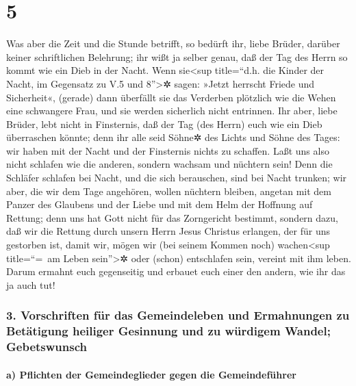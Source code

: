 \hypertarget{section-4}{%
\section{5}\label{section-4}}

 Was aber die Zeit und die Stunde betrifft, so bedürft
ihr, liebe Brüder, darüber keiner schriftlichen Belehrung;
 ihr wißt ja selber genau, daß der Tag des Herrn so kommt
wie ein Dieb in der Nacht.  Wenn sie\textless sup
title=``d.h. die Kinder der Nacht, im Gegensatz zu V.5 und
8''\textgreater✲ sagen: »Jetzt herrscht Friede und Sicherheit«, (gerade)
dann überfällt sie das Verderben plötzlich wie die Wehen eine schwangere
Frau, und sie werden sicherlich nicht entrinnen.  Ihr
aber, liebe Brüder, lebt nicht in Finsternis, daß der Tag (des Herrn)
euch wie ein Dieb überraschen könnte;  denn ihr alle seid
Söhne✲ des Lichts und Söhne des Tages: wir haben mit der Nacht und der
Finsternis nichts zu schaffen.  Laßt uns also nicht
schlafen wie die anderen, sondern wachsam und nüchtern sein!
 Denn die Schläfer schlafen bei Nacht, und die sich
berauschen, sind bei Nacht trunken;  wir aber, die wir dem
Tage angehören, wollen nüchtern bleiben, angetan mit dem Panzer des
Glaubens und der Liebe und mit dem Helm der Hoffnung auf Rettung;
 denn uns hat Gott nicht für das Zorngericht bestimmt,
sondern dazu, daß wir die Rettung durch unsern Herrn Jesus Christus
erlangen,  der für uns gestorben ist, damit wir, mögen
wir (bei seinem Kommen noch) wachen\textless sup title=``=~am Leben
sein''\textgreater✲ oder (schon) entschlafen sein, vereint mit ihm
leben.  Darum ermahnt euch gegenseitig und erbauet euch
einer den andern, wie ihr das ja auch tut!

\hypertarget{vorschriften-fuxfcr-das-gemeindeleben-und-ermahnungen-zu-betuxe4tigung-heiliger-gesinnung-und-zu-wuxfcrdigem-wandel-gebetswunsch}{%
\subsubsection{3. Vorschriften für das Gemeindeleben und Ermahnungen zu
Betätigung heiliger Gesinnung und zu würdigem Wandel;
Gebetswunsch}\label{vorschriften-fuxfcr-das-gemeindeleben-und-ermahnungen-zu-betuxe4tigung-heiliger-gesinnung-und-zu-wuxfcrdigem-wandel-gebetswunsch}}

\hypertarget{a-pflichten-der-gemeindeglieder-gegen-die-gemeindefuxfchrer}{%
\paragraph{a) Pflichten der Gemeindeglieder gegen die
Gemeindeführer}\label{a-pflichten-der-gemeindeglieder-gegen-die-gemeindefuxfchrer}}

